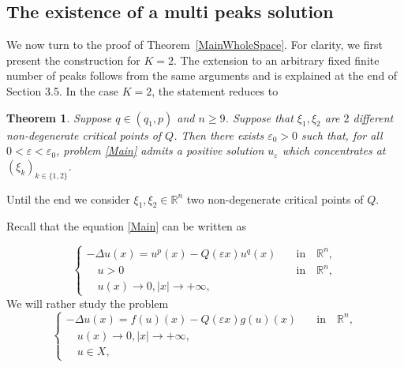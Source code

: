 \documentclass[12pt]{amsart}
\theoremstyle{plain}
\newtheorem{theorem}{Theorem}[section]   %
\theoremstyle{definition}
\theoremstyle{remark}
\renewcommand{\epsilon}{\varepsilon}
\begin{document}
\subsection{The existence of a multi peaks solution}



We now turn to the proof of Theorem~\ref{MainWholeSpace}. For clarity,
we first present the construction for \(K=2\). The extension to an
arbitrary fixed finite number of peaks follows from the same arguments
and is explained at the end of Section 3.5. In the case \(K=2\), the
statement reduces to
 \medskip
\medskip
\begin{theorem}\label{Main 2 peaks}
Suppose $q\in(q_1,p)$ and $n\geq9$.
Suppose that $\xi_1,\xi_2$ are $2$ different
non-degenerate critical points of $Q$. Then there exists $\epsilon_0 > 0$ such that, for all $0 < \epsilon < \epsilon_0$,
problem \eqref{Main} admits a positive solution $u_{\epsilon}$ which concentrates at $(\xi_k)_{k \in \{1,2\}}$.

\end{theorem}
\medskip 

\noindent Until the end we consider $\xi_1, \xi_2\in \mathbb{R}^n$  \noindent two non-degenerate critical points of $Q$. 

 \noindent  Recall that the equation \eqref{Main} can be written as


\begin{equation}\label{BVP1-R} 
 \tag{$7$}
 \begin{cases} 
    -\Delta u(x)=u^p(x)-Q(\epsilon x)u^q(x) \quad &\text{in} \quad \mathbb{R}^n, \\
        \quad u > 0  \quad &\text{in}  \quad \mathbb{R}^n,\\
        \quad u(x)\rightarrow0,|x|\rightarrow +\infty,
\end{cases}
\end{equation} 
We will rather study the problem
\begin{equation}\label{Alternative} 
 \tag{$8$}
 \begin{cases} 
    -\Delta u(x)=f(u)(x)-Q(\epsilon x)g(u)(x) \quad &\text{in} \quad \mathbb{R}^n, \\
    \quad u(x)\rightarrow0,|x|\rightarrow +\infty,\\
          \quad u \in X,
\end{cases}
\end{equation} 
\end{document}
